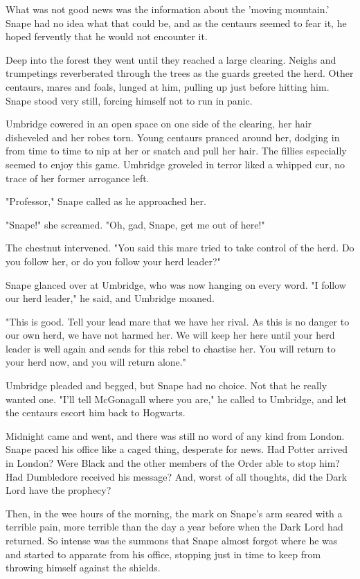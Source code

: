 \documentclass[a4paper,11pt]{article}
\begin{document}
What was not good news was the information about the 'moving mountain.' Snape had no idea what that could be, and as the centaurs seemed to fear it, he hoped fervently that he would not encounter it.

Deep into the forest they went until they reached a large clearing. Neighs and trumpetings reverberated through the trees as the guards greeted the herd. Other centaurs, mares and foals, lunged at him, pulling up just before hitting him. Snape stood very still, forcing himself not to run in panic.

Umbridge cowered in an open space on one side of the clearing, her hair disheveled and her robes torn. Young centaurs pranced around her, dodging in from time to time to nip at her or snatch and pull her hair. The fillies especially seemed to enjoy this game. Umbridge groveled in terror liked a whipped cur, no trace of her former arrogance left.

"Professor," Snape called as he approached her.

"Snape!" she screamed. "Oh, gad, Snape, get me out of here!"

The chestnut intervened. "You said this mare tried to take control of the herd. Do you follow her, or do you follow your herd leader?"

Snape glanced over at Umbridge, who was now hanging on every word. "I follow our herd leader," he said, and Umbridge moaned.

"This is good. Tell your lead mare that we have her rival. As this is no danger to our own herd, we have not harmed her. We will keep her here until your herd leader is well again and sends for this rebel to chastise her. You will return to your herd now, and you will return alone."

Umbridge pleaded and begged, but Snape had no choice. Not that he really wanted one. "I'll tell McGonagall where you are," he called to Umbridge, and let the centaurs escort him back to Hogwarts.

Midnight came and went, and there was still no word of any kind from London. Snape paced his office like a caged thing, desperate for news. Had Potter arrived in London? Were Black and the other members of the Order able to stop him? Had Dumbledore received his message? And, worst of all thoughts, did the Dark Lord have the prophecy?

Then, in the wee hours of the morning, the mark on Snape's arm seared with a terrible pain, more terrible than the day a year before when the Dark Lord had returned. So intense was the summons that Snape almost forgot where he was and started to apparate from his office, stopping just in time to keep from throwing himself against the shields.
\end{document}
